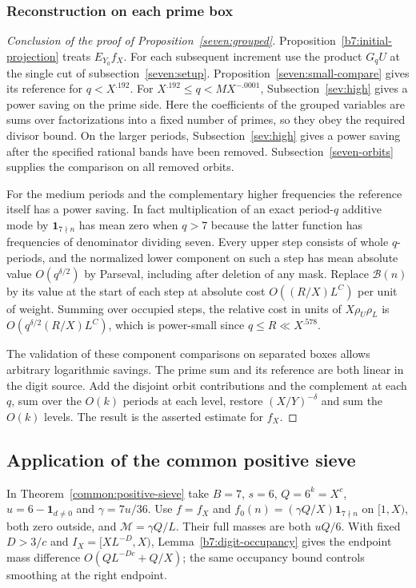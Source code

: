 \documentclass[11pt,a4paper]{article}
\theoremstyle{paperplain}
\numberwithin{equation}{section}
\newcommand{\ind}{\mathbf1}
\begin{document}
\subsubsection{Reconstruction on each prime box}
\begin{proof}[Conclusion of the proof of Proposition~\ref{seven:grouped}]
Proposition~\ref{b7:initial-projection} treats $E_{Y_0}f_X$.
For each subsequent increment use the product $G_q U$ at the single
cut of subsection~\ref{seven:setup}. Proposition~\ref{seven:small-compare}
gives its reference for $q<X^{.192}$.
For $X^{.192}\le q<MX^{-.0001}$, Subsection~\ref{sev:high} gives a
power saving on the prime side. Here the coefficients of the grouped
variables are sums over factorizations into a fixed number of primes,
so they obey the required divisor bound. On the larger periods,
Subsection~\ref{sev:high} gives a power saving after the specified
rational bands have been removed. Subsection~\ref{seven-orbits} supplies
the comparison on all removed orbits.

For the medium periods and the complementary higher frequencies the
reference itself has a power saving. In fact multiplication of an
exact period-$q$ additive mode by $\mathbf 1_{7\nmid n}$ has mean
zero when $q>7$ because the latter function has frequencies of denominator
dividing seven. Every upper step consists of whole $q$-periods,
and the normalized lower component on such a step has mean absolute
value $O(q^{\delta/2})$ by Parseval, including after deletion of any
mask. Replace $\mathcal B(n)$ by its value at the start of each
step at absolute cost $O((R/X)L^C)$ per unit of weight. Summing
over occupied steps, the relative cost in units of
$X\rho_U\rho_L$ is $O(q^{\delta/2}(R/X)L^C)$, which is power-small
since $q\le R\ll X^{.578}$.

The validation of these component comparisons on separated boxes
allows arbitrary logarithmic savings. The prime sum and its reference
are both linear in the digit source. Add the disjoint orbit
contributions and the complement at each $q$, sum over the $O(k)$
periods at each level, restore $(X/Y)^{-\delta}$ and sum the
$O(k)$ levels. The result is the asserted estimate for $f_X$.
\end{proof}

\subsection{Application of the common positive sieve}\label{sieve:seven}
In Theorem~\ref{common:positive-sieve} take $B=7$, $s=6$,
$Q=6^k=X^c$, $u=6-\ind_{d\ne0}$ and $\gamma=7u/36$.
Use $f=f_X$ and $f_0(n)=(\gamma Q/X)\ind_{7\nmid n}$ on $[1,X)$,
both zero outside, and $\mathcal M=\gamma Q/L$. Their full masses
are both $uQ/6$. With fixed $D>3/c$ and $I_X=[XL^{-D},X)$,
Lemma~\ref{b7:digit-occupancy} gives the endpoint mass difference
$O(QL^{-Dc}+Q/X)$; the same occupancy bound controls smoothing
at the right endpoint.
\end{document}
